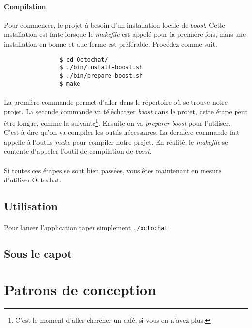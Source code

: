 \documentclass[a4paper]{article}
\begin{document}
			\paragraph{Compilation}{
			Pour commencer, le projet à besoin d'un installation locale de \textit{boost}. Cette installation est faite
			lorsque le \textit{makefile} est appelé pour la première fois, mais une installation en bonne et due forme est
			préférable. Procédez comme suit.
			}
			\begin{verbatim}
				$ cd Octochat/
				$ ./bin/install-boost.sh
				$ ./bin/prepare-boost.sh
				$ make
			\end{verbatim}
			\paragraph{}{
			La première commande permet d'aller dans le répertoire où se trouve notre projet.
			La seconde commande va télécharger \textit{boost} dans le projet, cette étape peut être longue, comme la suivante\footnote{C'est le moment d'aller chercher un café, si vous en n'avez plus.}.
			Ensuite on va \textit{preparer} \textit{boost} pour l'utiliser. C'est-à-dire qu'on va compiler les outils nécessaires.
			La dernière commande fait appelle à l'outils \textit{make} pour compiler notre projet. En réalité, le \textit{makefile}
			se contente d'appeler l'outil de compilation de \textit{boost}.
			}
			\paragraph{}{
			Si toutes ces étapes se sont bien passées, vous êtes maintenant en mesure d'utiliser Octochat.
			}
		
		\subsection{Utilisation}
			\paragraph{}{
			Pour lancer l'application taper simplement \verb|./octochat|
			}
		
		\subsection{Sous le capot}
		
		\newpage
		
	\section{Patrons de conception}
\end{document}
